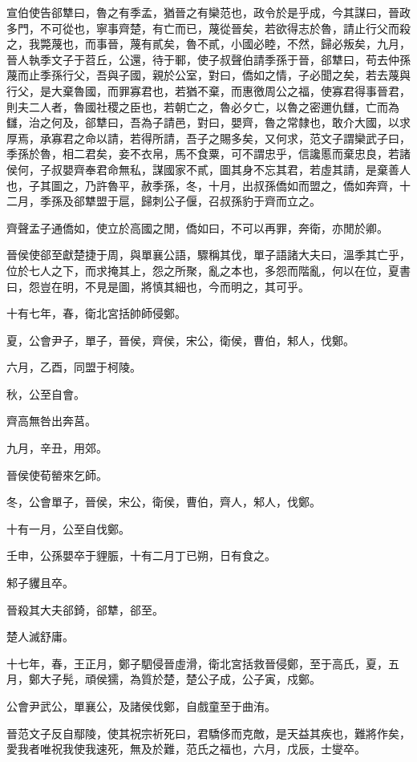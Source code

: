 \begin{pinyinscope}
宣伯使告郤犨曰，魯之有季孟，猶晉之有欒范也，政令於是乎成，今其謀曰，晉政多門，不可從也，寧事齊楚，有亡而已，蔑從晉矣，若欲得志於魯，請止行父而殺之，我斃蔑也，而事晉，蔑有貳矣，魯不貳，小國必睦，不然，歸必叛矣，九月，晉人執季文子于苕丘，公還，待于鄆，使子叔聲伯請季孫于晉，郤犨曰，苟去仲孫蔑而止季孫行父，吾與子國，親於公室，對曰，僑如之情，子必聞之矣，若去蔑與行父，是大棄魯國，而罪寡君也，若猶不棄，而惠徼周公之福，使寡君得事晉君，則夫二人者，魯國社稷之臣也，若朝亡之，魯必夕亡，以魯之密邇仇讎，亡而為讎，治之何及，郤犨曰，吾為子請邑，對曰，嬰齊，魯之常隸也，敢介大國，以求厚焉，承寡君之命以請，若得所請，吾子之賜多矣，又何求，范文子謂欒武子曰，季孫於魯，相二君矣，妾不衣帛，馬不食粟，可不謂忠乎，信讒慝而棄忠良，若諸侯何，子叔嬰齊奉君命無私，謀國家不貳，圖其身不忘其君，若虛其請，是棄善人也，子其圖之，乃許魯平，赦季孫，冬，十月，出叔孫僑如而盟之，僑如奔齊，十二月，季孫及郤犨盟于扈，歸刺公子偃，召叔孫豹于齊而立之。

齊聲孟子通僑如，使立於高國之閒，僑如曰，不可以再罪，奔衛，亦閒於卿。

晉侯使郤至獻楚捷于周，與單襄公語，驟稱其伐，單子語諸大夫曰，溫季其亡乎，位於七人之下，而求掩其上，怨之所聚，亂之本也，多怨而階亂，何以在位，夏書曰，怨豈在明，不見是圖，將慎其細也，今而明之，其可乎。

十有七年，春，衛北宮括帥師侵鄭。

夏，公會尹子，單子，晉侯，齊侯，宋公，衛侯，曹伯，邾人，伐鄭。

六月，乙酉，同盟于柯陵。

秋，公至自會。

齊高無咎出奔莒。

九月，辛丑，用郊。

晉侯使荀罃來乞師。

冬，公會單子，晉侯，宋公，衛侯，曹伯，齊人，邾人，伐鄭。

十有一月，公至自伐鄭。

壬申，公孫嬰卒于貍脤，十有二月丁已朔，日有食之。

邾子貜且卒。

晉殺其大夫郤錡，郤犨，郤至。

楚人滅舒庸。

十七年，春，王正月，鄭子駟侵晉虛滑，衛北宮括救晉侵鄭，至于高氏，夏，五月，鄭大子髡，頑侯獳，為質於楚，楚公子成，公子寅，戍鄭。

公會尹武公，單襄公，及諸侯伐鄭，自戲童至于曲洧。

晉范文子反自鄢陵，使其祝宗祈死曰，君驕侈而克敵，是天益其疾也，難將作矣，愛我者唯祝我使我速死，無及於難，范氏之福也，六月，戊辰，士燮卒。


\end{pinyinscope}
